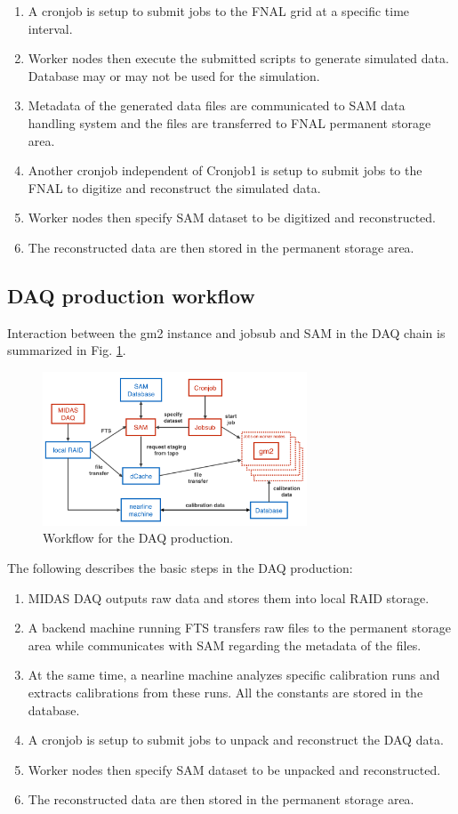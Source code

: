 \begin{enumerate}
\item A cronjob is setup to submit jobs to the FNAL grid at a specific time interval.
\item Worker nodes then execute the submitted scripts to generate simulated data. Database may or may not be used for the simulation.
\item Metadata of the generated data files are communicated to SAM data handling system and the files are transferred to FNAL permanent storage area.
\item Another cronjob independent of Cronjob1 is setup to submit jobs to the FNAL to digitize and reconstruct the simulated data.
\item Worker nodes then specify SAM dataset to be digitized and reconstructed.
\item The reconstructed data are then stored in the permanent storage area.
\end{enumerate}

\subsection{DAQ production workflow}

Interaction between the gm2 instance and jobsub and SAM in the DAQ chain is summarized in Fig. \ref{fig:DAQProd}.

\begin{figure}[htbp]
\centering
\includegraphics[width=0.7\textwidth]{pics/DAQProductionWorkflow.pdf} 
\caption{Workflow for the DAQ production.}\label{fig:DAQProd}
\end{figure}

The following describes the basic steps in the DAQ production:
\begin{enumerate}
\item MIDAS DAQ outputs raw data and stores them into local RAID storage.
\item A backend machine running FTS transfers raw files to the permanent storage area while communicates with SAM regarding the metadata of the files.
\item At the same time, a nearline machine analyzes specific calibration runs and extracts calibrations from these runs. All the constants are stored in the database.
\item A cronjob is setup to submit jobs to unpack and reconstruct the DAQ data.
\item Worker nodes then specify SAM dataset to be unpacked and reconstructed.
\item The reconstructed data are then stored in the permanent storage area.
\end{enumerate}

